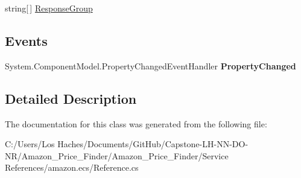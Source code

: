 \begin{DoxyCompactItemize}
\begin{DoxyCompactList}\small\item\em \end{DoxyCompactList}\item 
\hypertarget{class_amazon___price___finder_1_1amazon_1_1ecs_1_1_cart_add_request_a39c61550045c1e3269f7cec4324fe1dd}{string\mbox{[}$\,$\mbox{]} \hyperlink{class_amazon___price___finder_1_1amazon_1_1ecs_1_1_cart_add_request_a39c61550045c1e3269f7cec4324fe1dd}{Response\-Group}}\label{class_amazon___price___finder_1_1amazon_1_1ecs_1_1_cart_add_request_a39c61550045c1e3269f7cec4324fe1dd}

\begin{DoxyCompactList}\small\item\em \end{DoxyCompactList}\end{DoxyCompactItemize}
\subsection*{Events}
\begin{DoxyCompactItemize}
\item 
\hypertarget{class_amazon___price___finder_1_1amazon_1_1ecs_1_1_cart_add_request_a67024238d3eddb310349debecf856a9d}{System.\-Component\-Model.\-Property\-Changed\-Event\-Handler {\bfseries Property\-Changed}}\label{class_amazon___price___finder_1_1amazon_1_1ecs_1_1_cart_add_request_a67024238d3eddb310349debecf856a9d}

\end{DoxyCompactItemize}


\subsection{Detailed Description}


The documentation for this class was generated from the following file\-:\begin{DoxyCompactItemize}
\item 
C\-:/\-Users/\-Los Haches/\-Documents/\-Git\-Hub/\-Capstone-\/\-L\-H-\/\-N\-N-\/\-D\-O-\/\-N\-R/\-Amazon\-\_\-\-Price\-\_\-\-Finder/\-Amazon\-\_\-\-Price\-\_\-\-Finder/\-Service References/amazon.\-ecs/Reference.\-cs\end{DoxyCompactItemize}
